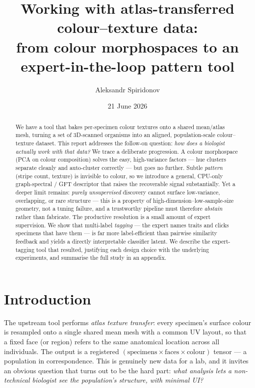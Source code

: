 \documentclass[11pt]{article}
\title{\vspace{-2.0em}Working with atlas-transferred colour--texture data:\\
from colour morphospaces to an expert-in-the-loop pattern tool}
\author{Aleksandr Spiridonov}
\date{21 June 2026}
\begin{document}
\maketitle
\vspace{-1.5em}

\begin{abstract}
\noindent
We have a tool that bakes per-specimen colour textures onto a shared mean/atlas mesh, turning a set of
3D-scanned organisms into an aligned, population-scale colour--texture dataset. This report addresses the
follow-on question: \emph{how does a biologist actually work with that data?} We trace a deliberate
progression. A colour morphospace (PCA on colour composition) solves the easy, high-variance factors --- hue
clusters separate cleanly and auto-cluster correctly --- but goes no further. Subtle \emph{pattern} (stripe
count, texture) is invisible to colour, so we introduce a general, CPU-only graph-spectral / GFT descriptor
that raises the recoverable signal substantially. Yet a deeper limit remains: \emph{purely unsupervised}
discovery cannot surface low-variance, overlapping, or rare structure --- this is a property of
high-dimension--low-sample-size geometry, not a tuning failure, and a trustworthy pipeline must therefore
\emph{abstain} rather than fabricate. The productive resolution is a small amount of expert supervision. We
show that multi-label \emph{tagging} --- the expert names traits and clicks specimens that have them --- is
far more label-efficient than pairwise similarity feedback and yields a directly interpretable classifier
latent. We describe the expert-tagging tool that resulted, justifying each design choice with the underlying
experiments, and summarise the full study in an appendix.
\end{abstract}

\section{Introduction}

The upstream tool performs \emph{atlas texture transfer}: every specimen's surface colour is resampled onto a
single shared mean mesh with a common UV layout, so that a fixed face (or region) refers to the same anatomical
location across all individuals. The output is a registered $(\text{specimens} \times \text{faces} \times
\text{colour})$ tensor --- a population in correspondence. This is genuinely new data for a lab, and it invites
an obvious question that turns out to be the hard part: \emph{what analysis lets a non-technical biologist see
the population's structure, with minimal UI?}
\end{document}
